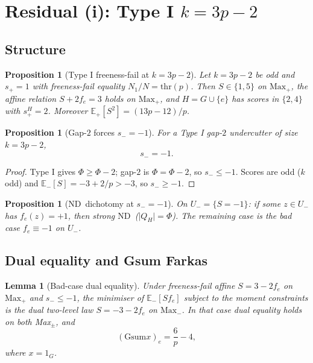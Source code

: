 \documentclass[11pt,a4paper]{article}
\theoremstyle{plain}
\newtheorem{lemma}[theorem]{Lemma}
\newtheorem{proposition}[theorem]{Proposition}
\theoremstyle{definition}
\newcommand{\Maxp}{\mathrm{Max}_{+}}
\newcommand{\Maxm}{\mathrm{Max}_{-}}
\newcommand{\Gsum}{\mathrm{Gsum}}
\newcommand{\thr}{\mathrm{thr}}
\newcommand{\ND}{\ensuremath{\mathrm{ND}}}
\newcommand{\ES}{\mathbb{E}}
\begin{document}
\section{Residual (i): Type I $k=3p-2$}
\label{sec:res-i}

\subsection{Structure}

\begin{proposition}[Type I freeness-fail at $k=3p-2$]
\label{prop:struct-i}
Let $k=3p-2$ be odd and $s_+=1$ with freeness-fail equality $N_1/N=\thr(p)$.
Then $S\in\{1,5\}$ on $\Maxp$, the affine relation $S+2f_e=3$ holds on $\Maxp$, and
$H=G\cup\{e\}$ has scores in $\{2,4\}$ with $s_+^H=2$.
Moreover $\ES_+[S^2]=(13p-12)/p$.
\end{proposition}

\begin{proposition}[Gap-$2$ forces $s_-=-1$]
\label{prop:gap2}
For a Type I gap-$2$ undercutter of size $k=3p-2$,
\[
s_-=-1.
\]
\end{proposition}

\begin{proof}
Type I gives $\Phi\ge\Phi-2$; gap-$2$ is $\Phi=\Phi-2$, so $s_-\le-1$.
Scores are odd ($k$ odd) and $\ES_-[S]=-3+2/p>-3$, so $s_-\ge-1$.
\end{proof}

\begin{proposition}[\ND\ dichotomy at $s_-=-1$]
\label{prop:dichotomy}
On $U_-=\{S=-1\}$: if some $z\in U_-$ has $f_e(z)=+1$, then strong \ND\ ($\lvert Q_H\rvert=\Phi$).
The remaining case is the \emph{bad case} $f_e\equiv-1$ on $U_-$.
\end{proposition}

\subsection{Dual equality and Gsum Farkas}

\begin{lemma}[Bad-case dual equality]
\label{lem:dual-eq}
Under freeness-fail affine $S=3-2f_e$ on $\Maxp$ and $s_-\le-1$, the minimiser of
$\ES_-[S f_e]$ subject to the moment constraints is the dual two-level law
$S=-3-2f_e$ on $\Maxm$.
In that case dual equality holds on both Max$_{\pm}$, and
\begin{equation}
\label{eq:need-i}
(\Gsum x)_e=\frac6p-4,
\end{equation}
where $x=1_G$.
\end{lemma}
\end{document}
